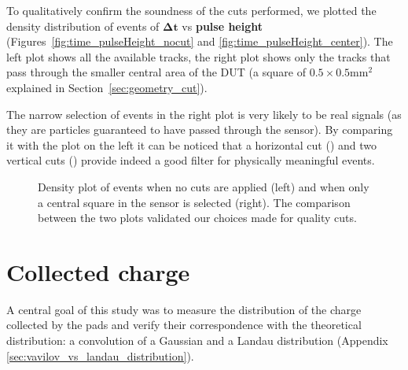To qualitatively confirm the soundness of the cuts performed, we plotted the density distribution of events of \(\boldsymbol{\Delta t}\) vs \textbf{pulse height} (Figures~\ref{fig:time_pulseHeight_nocut} and \ref{fig:time_pulseHeight_center}). The left plot shows all the available tracks, the right plot shows only the tracks that pass through the smaller central area of the DUT (a square of \(0.5\times0.5\unit{\milli\meter^2}\) explained in Section~\ref{sec:geometry_cut}).

The narrow selection of events in the right plot is very likely to be real signals (as they are particles guaranteed to have passed through the sensor). By comparing it with the plot on the left it can be noticed that a horizontal cut () and two vertical cuts () provide indeed a good filter for physically meaningful events. 


\begin{figure}[h!tbp]
    \centering
    \hfill
    \centering
    \captionsetup{width=\captionwidth}
        \caption{Density plot of events when no cuts are applied (left) and when only a central square in the sensor is selected (right). The comparison between the two plots validated our choices made for quality cuts.}
\end{figure}


\section{Collected charge}\label{sec:methods_collected_charge}

A central goal of this study was to measure the distribution of the charge collected by the pads and verify their correspondence with the theoretical distribution: a convolution of a Gaussian and a Landau distribution (Appendix \ref{sec:vavilov_vs_landau_distribution}).

